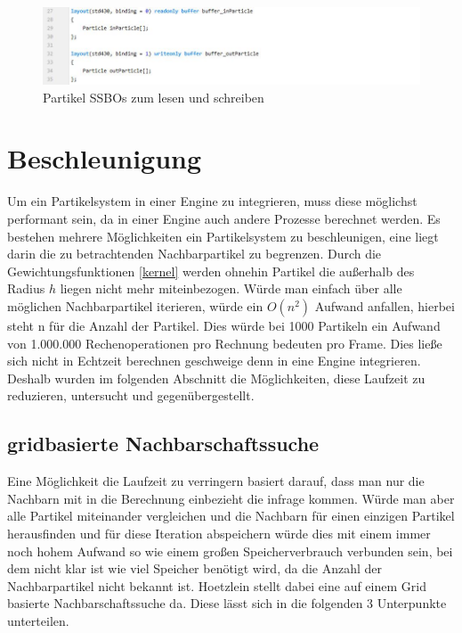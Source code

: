 \documentclass[intern,palatino]{cgBA}
\begin{document}
\begin{figure}[H]
	\centering
	\includegraphics[width=1.3\columnwidth]{Bilder/Flipflop.jpg}
	\caption{Partikel SSBOs zum lesen und schreiben}
	\label{img:flipflop}
\end{figure}
\newpage

\section{Beschleunigung}\label{besch}

Um ein Partikelsystem in einer Engine zu integrieren, muss diese möglichst performant sein, da in einer Engine auch andere Prozesse berechnet werden. Es bestehen mehrere Möglichkeiten ein Partikelsystem zu beschleunigen, eine liegt darin die zu betrachtenden Nachbarpartikel zu begrenzen. Durch die Gewichtungsfunktionen \ref{kernel} werden ohnehin Partikel die außerhalb des Radius $h$ liegen nicht mehr miteinbezogen. Würde man einfach über alle möglichen Nachbarpartikel iterieren, würde ein $O(n^2)$ Aufwand anfallen, hierbei steht n für die Anzahl der Partikel. Dies würde bei 1000 Partikeln ein Aufwand von 1.000.000 Rechenoperationen pro Rechnung bedeuten pro Frame. Dies ließe sich nicht in Echtzeit berechnen geschweige denn in eine Engine integrieren. Deshalb wurden im folgenden Abschnitt die Möglichkeiten, diese Laufzeit zu reduzieren, untersucht und gegenübergestellt.  


\subsection{gridbasierte Nachbarschaftssuche}\label{nachbar}

Eine Möglichkeit die Laufzeit zu verringern basiert darauf, dass man nur die Nachbarn mit in die Berechnung einbezieht die infrage kommen. Würde man aber alle Partikel miteinander vergleichen und die Nachbarn für einen einzigen Partikel herausfinden und für diese Iteration abspeichern würde dies mit einem immer noch hohem Aufwand so wie einem großen Speicherverbrauch verbunden sein, bei dem nicht klar ist wie viel Speicher benötigt wird, da die Anzahl der Nachbarpartikel nicht bekannt ist.
\newline
Hoetzlein \cite{nvidia} stellt dabei eine auf einem Grid basierte Nachbarschaftssuche da. Diese lässt sich in die folgenden 3 Unterpunkte unterteilen.
\end{document}

